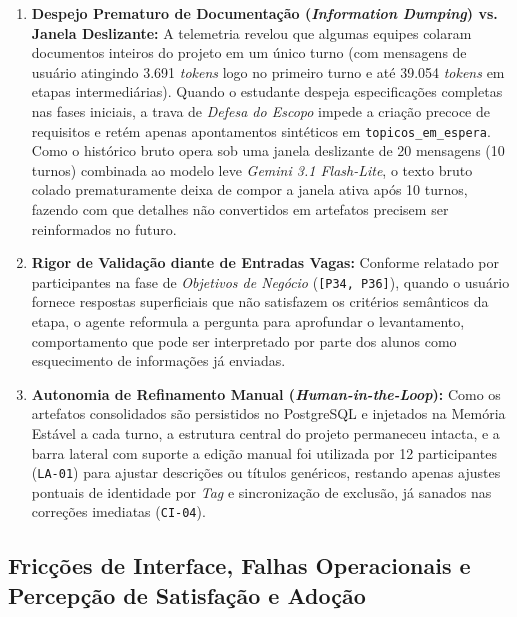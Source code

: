 \begin{enumerate}
    \item \textbf{Despejo Prematuro de Documentação (\textit{Information Dumping}) vs. Janela Deslizante:} A telemetria revelou que algumas equipes colaram documentos inteiros do projeto em um único turno (com mensagens de usuário atingindo 3.691 \textit{tokens} logo no primeiro turno e até 39.054 \textit{tokens} em etapas intermediárias). Quando o estudante despeja especificações completas nas fases iniciais, a trava de \textit{Defesa do Escopo} impede a criação precoce de requisitos e retém apenas apontamentos sintéticos em \texttt{topicos\_em\_espera}. Como o histórico bruto opera sob uma janela deslizante de 20 mensagens (10 turnos) combinada ao modelo leve \textit{Gemini 3.1 Flash-Lite}, o texto bruto colado prematuramente deixa de compor a janela ativa após 10 turnos, fazendo com que detalhes não convertidos em artefatos precisem ser reinformados no futuro.
    \item \textbf{Rigor de Validação diante de Entradas Vagas:} Conforme relatado por participantes na fase de \textit{Objetivos de Negócio} (\texttt{[P34, P36]}), quando o usuário fornece respostas superficiais que não satisfazem os critérios semânticos da etapa, o agente reformula a pergunta para aprofundar o levantamento, comportamento que pode ser interpretado por parte dos alunos como esquecimento de informações já enviadas.
    \item \textbf{Autonomia de Refinamento Manual (\textit{Human-in-the-Loop}):} Como os artefatos consolidados são persistidos no PostgreSQL e injetados na Memória Estável a cada turno, a estrutura central do projeto permaneceu intacta, e a barra lateral com suporte a edição manual foi utilizada por 12 participantes (\texttt{LA-01}) para ajustar descrições ou títulos genéricos, restando apenas ajustes pontuais de identidade por \textit{Tag} e sincronização de exclusão, já sanados nas correções imediatas (\texttt{CI-04}).
\end{enumerate}

\subsection{Fricções de Interface, Falhas Operacionais e Percepção de Satisfação e Adoção}

